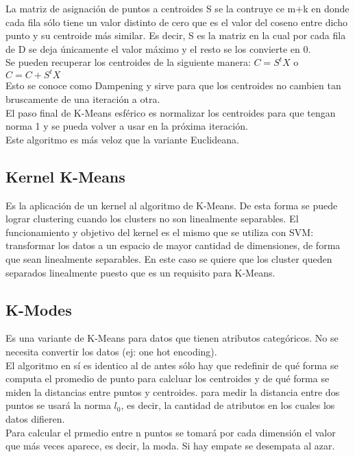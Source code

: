 \documentclass[titlepage,a4paper]{article}
\begin{document}
La matriz de asignación de puntos a centroides S se la contruye ce m+k en donde cada fila sólo tiene un valor distinto de cero que es el valor del coseno entre dicho punto y su centroide más similar. Es decir, S es la matriz en la cual por cada fila de D se deja únicamente el valor máximo y el resto se los convierte en 0. \\

Se pueden recuperar los centroides de la siguiente manera: $C = S^t X$ o $ C = C + S^t X$ \\

Esto se conoce como Dampening y sirve para que los centroides no cambien tan bruscamente de una iteración a otra. \\

El paso final de K-Means esférico es normalizar los centroides para que tengan norma 1 y se pueda volver a usar en la próxima iteración. \\

Este algoritmo es más veloz que la variante Euclideana. 

\subsection*{Kernel K-Means}
Es la aplicación de un kernel al algoritmo de K-Means. De esta forma se puede lograr clustering cuando los clusters no son linealmente separables. El funcionamiento y objetivo del kernel es el mismo que se utiliza con SVM: transformar los datos a un espacio de mayor cantidad de dimensiones, de forma que sean linealmente separables. En este caso se quiere que los cluster queden separados linealmente puesto que es un requisito para K-Means. 

\subsection*{K-Modes}
Es una variante de K-Means para datos que tienen atributos categóricos. No se necesita convertir los datos (ej: one hot encoding). \\

El algoritmo en sí es identico al de antes sólo hay que redefinir de qué forma se computa el promedio de punto  para calcluar los centroides y de qué forma se miden la distancias entre puntos y centroides. para medir la distancia entre dos puntos se usará la norma $l_0$, es decir, la cantidad de atributos en los cuales los datos difieren. \\

Para calcular el prmedio entre n puntos se tomará por cada dimensión el valor que más veces aparece, es decir, la moda. Si hay empate se desempata al azar. \\
\end{document}
